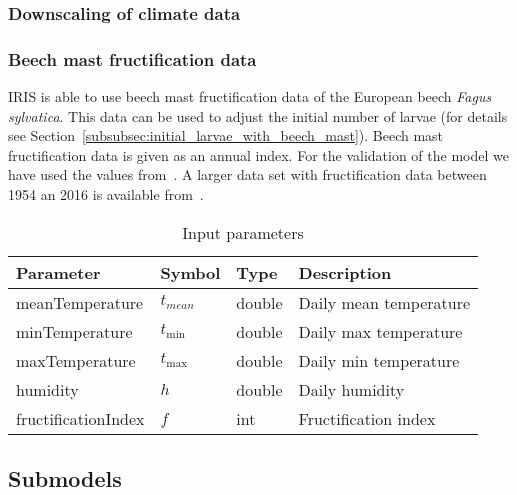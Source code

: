 \documentclass[a4paper, 11pt]{scrartcl}
\begin{document}

\subsubsection{Downscaling of climate data}


\subsubsection{Beech mast fructification data}\label{subsubsec:beech_mast_data}
IRIS is able to use beech mast fructification data of the European beech \textit{Fagus sylvatica}. This data can be used to adjust the initial number of larvae
(for details see Section~\ref{subsubsec:initial_larvae_with_beech_mast}). Beech mast fructification data is given as an annual index. For the validation of the model we have
used the values from~\cite{Brugger.2018}. A larger data set with fructification data between 1954 an 2016 is available from~\cite{Konnert.2016}.


\begin{table}[h!]
\caption{Input parameters}
\label{tab:input_parameters}
\begin{tabularx}{\textwidth}{llll}
\toprule
\textbf{Parameter} & \textbf{Symbol} & \textbf{Type}     & \textbf{Description}       \\
\midrule
meanTemperature    & $t_{mean}$      & double            & Daily mean temperature     \\
minTemperature     & $t_{\min}$      & double            & Daily max temperature      \\
maxTemperature     & $t_{\max}$      & double            & Daily min temperature      \\
humidity           & $h$             & double            & Daily humidity             \\
\midrule
fructificationIndex & $f$            & int               & Fructification index       \\
\bottomrule
\end{tabularx}
\end{table}


\newpage
\subsection{Submodels}
\end{document}

